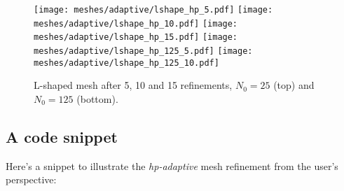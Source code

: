 \begin{figure}[!ht]
	\centering
	\texttt{[image: meshes/adaptive/lshape\_hp\_5.pdf]}
	\texttt{[image: meshes/adaptive/lshape\_hp\_10.pdf]}
	\texttt{[image: meshes/adaptive/lshape\_hp\_15.pdf]}
    \texttt{[image: meshes/adaptive/lshape\_hp\_125\_5.pdf]}
	\texttt{[image: meshes/adaptive/lshape\_hp\_125\_10.pdf]}
	\caption{L-shaped mesh after 5, 10 and 15 refinements, $N_0 = 25$ (top) and $N_0 = 125$ (bottom).}
\end{figure}

\newpage
\subsection{A code snippet}

Here's a snippet to illustrate the \textit{hp-adaptive} mesh refinement from the user's perspective:

